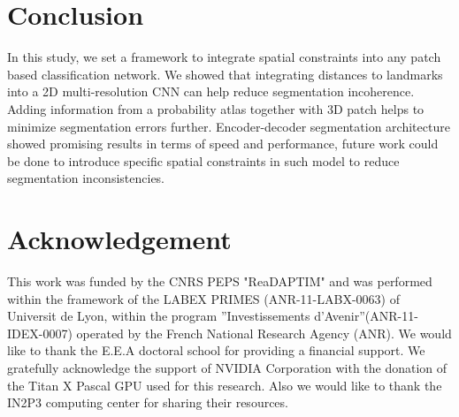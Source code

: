 \documentclass{article}
\begin{document}
\section{Conclusion}
In this study, we set a framework to integrate spatial constraints into any patch based classification network. We showed that integrating distances to landmarks into a 2D multi-resolution CNN can help reduce segmentation incoherence. Adding information from a probability atlas together with 3D patch helps to minimize segmentation errors further. \newline
Encoder-decoder segmentation architecture showed promising results in terms of speed and performance, future work could be done to introduce specific spatial constraints in such model to reduce segmentation inconsistencies.

\section{Acknowledgement}
This work was funded by the CNRS PEPS "ReaDAPTIM" and was performed within the framework of the LABEX PRIMES (ANR-11-LABX-0063) of Universit de Lyon, within the program ”Investissements d’Avenir”(ANR-11-IDEX-0007) operated by the French National Research Agency (ANR). We would like to thank the E.E.A doctoral school for providing a financial support.
We gratefully acknowledge the support of NVIDIA Corporation with the donation of the Titan X Pascal GPU used for this research. Also we would like to thank the IN2P3 computing center for sharing their resources.
\end{document}
